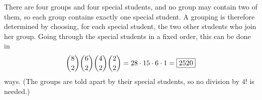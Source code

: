 There are four groups and four special students, and no group may contain two of them, so each group contains exactly one special student. A grouping is therefore determined by choosing, for each special student, the two other students who join her group. Going through the special students in a fixed order, this can be done in
\[\dbinom82\dbinom62\dbinom42\dbinom22=28\cdot15\cdot6\cdot1=\boxed{2520}\]
ways. (The groups are told apart by their special students, so no division by $4!$ is needed.)
